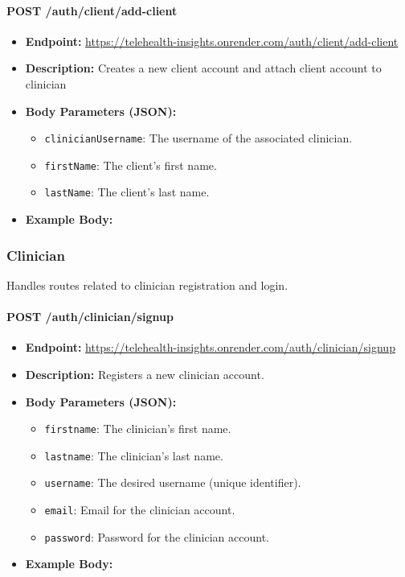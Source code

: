 \documentclass{article}
\begin{document}
  \paragraph{POST /auth/client/add-client}
\begin{itemize}
    \item \textbf{Endpoint:} 
        \url{https://telehealth-insights.onrender.com/auth/client/add-client}
    \item \textbf{Description:} Creates a new client account and attach client account to clinician
    \item \textbf{Body Parameters (JSON):}
    \begin{itemize}
        \item \texttt{clinicianUsername}: The username of the associated clinician.
        \item \texttt{firstName}: The client's first name.
        \item \texttt{lastName}: The client's last name.
    \end{itemize}
    \item \textbf{Example Body:}
\end{itemize}

\subsubsection{Clinician}
Handles routes related to clinician registration and login.

\paragraph{POST /auth/clinician/signup}
\begin{itemize}
    \item \textbf{Endpoint:} 
        \url{https://telehealth-insights.onrender.com/auth/clinician/signup}
    \item \textbf{Description:} Registers a new clinician account.
    \item \textbf{Body Parameters (JSON):}
    \begin{itemize}
        \item \texttt{firstname}: The clinician’s first name.
        \item \texttt{lastname}: The clinician’s last name.
        \item \texttt{username}: The desired username (unique identifier).
        \item \texttt{email}: Email for the clinician account.
        \item \texttt{password}: Password for the clinician account.
    \end{itemize}
    \item \textbf{Example Body:}
\end{itemize}
\end{document}
